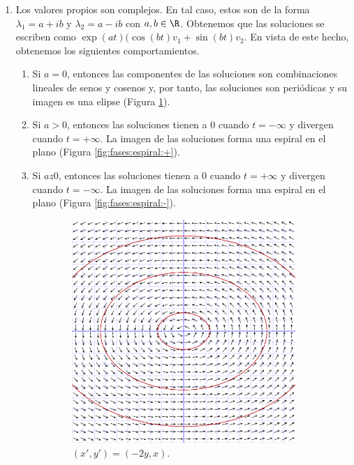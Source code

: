 \begin{enumerate}
\item Los valores propios son complejos. En tal caso, estos son de la forma $\lambda_1 = a+ib$ y
  $\lambda_2 = a-ib$ con $a,b \in \R$. Obtenemos que las soluciones se escriben como
  $\exp(at)( \cos(bt) v_1 + \sin(bt) v_2$. En vista de este hecho, obtenemos los siguientes
  comportamientos.
  \begin{enumerate}[label=\arabic*.]
  \item Si $a = 0$, entonces las componentes de las soluciones son combinaciones lineales de senos y
    cosenos y, por tanto, las soluciones son periódicas y su imagen es una elipse (Figura
    \ref{fig:fases:elip}).
  \item Si $a > 0$, entonces las soluciones tienen a $0$ cuando $t = -\infty$ y divergen cuando
    $t = +\infty$. La imagen de las soluciones forma una espiral en el plano (Figura \ref{fig:fases:espiral:+}).
  \item Si $a z 0$, entonces las soluciones tienen a $0$ cuando $t = +\infty$ y divergen cuando
    $t = -\infty$. La imagen de las soluciones forma una espiral en el plano (Figura \ref{fig:fases:espiral:-}).
  \end{enumerate}
  \begin{figure}[H]
    \centering
    \begin{subfigure}{.45\textwidth}
      \centering
      \includegraphics[width=.8\textwidth]{./images/fases-elip.png}
      \caption{$(x', y') = (-2y, x)$.}
      \label{fig:fases:elip}
    \end{subfigure}
    \begin{subfigure}{.45\textwidth}

\end{subfigure}
\end{figure}
\end{enumerate}
